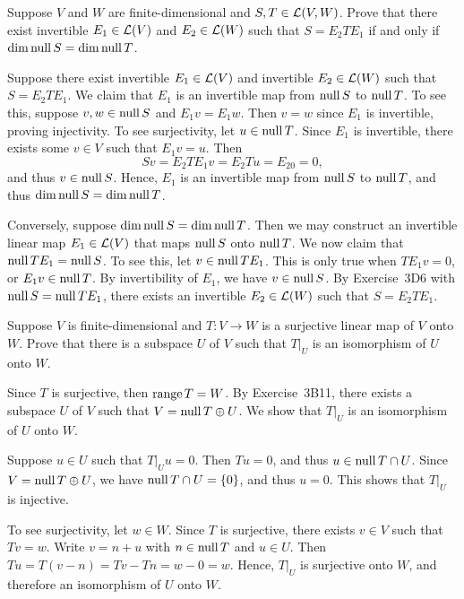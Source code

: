 \begin{exc}
\begin{exercise}
Suppose $V$ and $W$ are finite-dimensional and $S,T\in\mathcal{L}(V,W)$. Prove that
there exist invertible $E_1\in\mathcal{L}(V)$ and $E_2\in\mathcal{L}(W)$ such that
$S=E_2TE_1$ if and only if $\operatorname{dim}\operatorname{null} S=\operatorname{dim}\operatorname{null} T$.
\end{exercise}
\begin{solution}
Suppose there exist invertible $E_1\in\mathcal{L}(V)$ and invertible $E_2\in\mathcal{L}(W)$
such that $S=E_2TE_1$. We claim that $E_1$ is an invertible map from $\operatorname{null} S$
to $\operatorname{null} T$. To see this, suppose $v,w\in\operatorname{null} S$ and $E_1v=E_1w$. Then $v=w$
since $E_1$ is invertible, proving injectivity. To see surjectivity, let
$u\in\operatorname{null} T$. Since $E_1$ is invertible, there exists some $v\in V$ such that
$E_1v=u$. Then
\[ Sv = E_2TE_1v = E_2Tu = E_20 = 0, \]
and thus $v\in\operatorname{null} S$. Hence, $E_1$ is an invertible map from $\operatorname{null} S$ to
$\operatorname{null} T$, and thus $\operatorname{dim}\operatorname{null} S=\operatorname{dim}\operatorname{null} T$.

Conversely, suppose $\operatorname{dim}\operatorname{null} S=\operatorname{dim}\operatorname{null} T$. Then we may construct an
invertible linear map $E_1\in\mathcal{L}(V)$ that maps $\operatorname{null} S$ onto $\operatorname{null} T$. We now
claim that $\operatorname{null} TE_1=\operatorname{null} S$. To see this, let $v\in\operatorname{null} TE_1$. This is only
true when $TE_1v=0$, or $E_1v\in\operatorname{null} T$. By invertibility of $E_1$, we have
$v\in\operatorname{null} S$. By Exercise~3D6 with $\operatorname{null} S=\operatorname{null} TE_1$, there exists an
invertible $E_2\in\mathcal{L}(W)$ such that $S=E_2TE_1$.
\end{solution}

\begin{exercise}
Suppose $V$ is finite-dimensional and $T\colon V\to W$ is a surjective linear
map of $V$ onto $W$. Prove that there is a subspace $U$ of $V$ such that
$T|_U$ is an isomorphism of $U$ onto $W$.
\end{exercise}
\begin{solution}
Since $T$ is surjective, then $\operatorname{range} T=W$. By Exercise~3B11, there exists a
subspace $U$ of $V$ such that $V=\operatorname{null} T\oplus U$. We show that $T|_U$ is an
isomorphism of $U$ onto $W$.

Suppose $u\in U$ such that $T|_Uu=0$. Then $Tu=0$, and thus
$u\in\operatorname{null} T\cap U$. Since $V=\operatorname{null} T\oplus U$, we have $\operatorname{null} T\cap U=\{0\}$, and
thus $u=0$. This shows that $T|_U$ is injective.

To see surjectivity, let $w\in W$. Since $T$ is surjective, there exists
$v\in V$ such that $Tv=w$. Write $v=n+u$ with $n\in\operatorname{null} T$ and $u\in U$. Then
$Tu=T(v-n)=Tv-Tn=w-0=w$. Hence, $T|_U$ is surjective onto $W$, and therefore an
isomorphism of $U$ onto $W$.
\end{solution}


\end{exc}
